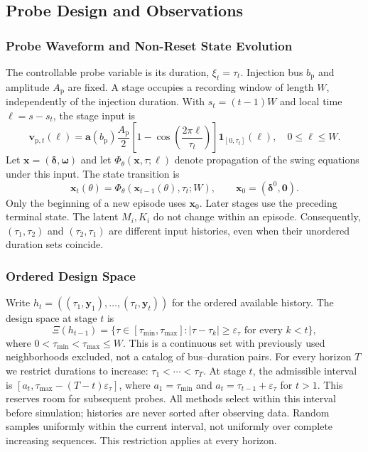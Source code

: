 \documentclass[journal]{IEEEtran}
\begin{document}
\subsection{Probe Design and Observations}
\label{sec:design-problem}
\label{sec:probe-design}
\label{sec:problem}
\subsubsection{Probe Waveform and Non-Reset State Evolution}
The controllable probe variable is its duration, $\xi_t=\tau_t$.
Injection bus $b_{\mathrm p}$ and amplitude $A_{\mathrm p}$ are fixed.
A stage occupies a recording window of length $W$, independently of the
injection duration. With $s_t=(t-1)W$ and local time $\ell=s-s_t$, the
stage input is
\begin{equation}
\mathbf v_{\mathrm p,t}(\ell)
=\mathbf a(b_{\mathrm p})\frac{A_{\mathrm p}}{2}
\left[1-\cos\left(\frac{2\pi\ell}{\tau_t}\right)\right]
\mathbf1_{[0,\tau_t]}(\ell),\quad 0\le\ell\le W.
\label{eq:probe-input}
\end{equation}
Let $\mathbf x=(\boldsymbol\delta,\boldsymbol\omega)$ and let
$\Phi_\theta(\mathbf x,\tau;\ell)$ denote propagation of the swing equations
under this input. The state transition is
\begin{equation}
\mathbf x_t(\theta)=\Phi_\theta(\mathbf x_{t-1}(\theta),\tau_t;W),
\qquad \mathbf x_0=(\boldsymbol\delta^0,\mathbf0).
\label{eq:carry}
\end{equation}
Only the beginning of a new episode uses $\mathbf x_0$. Later stages use the
preceding terminal state. The latent $M_i,K_i$ do not change within an episode.
Consequently, $(\tau_1,\tau_2)$ and $(\tau_2,\tau_1)$ are different input
histories, even when their unordered duration sets coincide.

\subsubsection{Ordered Design Space}
Write $h_t=((\tau_1,\mathbf y_1),\ldots,(\tau_t,\mathbf y_t))$ for the
ordered available history. The design space at stage $t$ is
\begin{equation}
\Xi(h_{t-1})=\{\tau\in[\tau_{\min},\tau_{\max}]:
|\tau-\tau_k|\ge\varepsilon_\tau\text{ for every }k<t\},
\label{eq:design-space}
\end{equation}
where $0<\tau_{\min}<\tau_{\max}\le W$. This is a continuous set with
previously used neighborhoods excluded, not a catalog of bus--duration pairs.
For every horizon $T$ we restrict durations to increase:
$\tau_1<\cdots<\tau_T$. At stage $t$, the admissible interval is
$[a_t,\tau_{\max}-(T-t)\varepsilon_\tau]$, where
$a_1=\tau_{\min}$ and $a_t=\tau_{t-1}+\varepsilon_\tau$ for $t>1$.
This reserves room for subsequent probes. All methods select within this
interval before simulation; histories are never sorted after observing data.
Random samples uniformly within the current interval, not uniformly over
complete increasing sequences. This restriction applies at every horizon.
\end{document}
